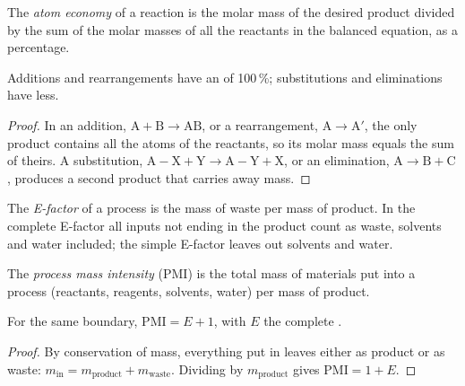 \begin{definition}\label{def:b3:green-industrial:atom-economy}
The \emph{atom economy} of a reaction is the molar mass of
the desired product divided by the sum of the molar masses of all the
reactants in the balanced equation, as a percentage.
\end{definition}

\begin{proposition}\label{prop:b3:green-industrial:ae-classes}
Additions and rearrangements have an  of 100\,\%; substitutions and
eliminations have less.
\end{proposition}

\begin{proof}
In an addition, $\mathrm{A} + \mathrm{B} \to \mathrm{AB}$, or a rearrangement, $\mathrm{A} \to \mathrm{A'}$, the only product contains all the
atoms of the reactants, so its molar mass equals the sum of theirs. A
substitution, $\mathrm{A{-}X} + \mathrm{Y} \to \mathrm{A{-}Y} + \mathrm{X}$, or an elimination, $\mathrm{A} \to \mathrm{B} + \mathrm{C}$, produces a
second product that carries away mass.
\end{proof}

\begin{definition}[E-factor]\label{def:b3:green-industrial:e-factor}
The \emph{E-factor} of a process is the mass of waste per mass of
product. In the complete E-factor all inputs not ending in the product count as
waste, solvents and water included; the simple E-factor leaves out solvents and
water.
\end{definition}

\begin{definition}\label{def:b3:green-industrial:pmi}
The \emph{process mass intensity} (PMI) is the
total mass of materials put into a process (reactants, reagents, solvents,
water) per mass of product.
\end{definition}

\begin{proposition}\label{prop:b3:green-industrial:pmi-e}
For the same boundary, $\mathrm{PMI} = E + 1$, with $E$ the complete .
\end{proposition}

\begin{proof}
By conservation of mass, everything put in leaves either as product or as waste:
$m_{\mathrm{in}} = m_{\mathrm{product}} + m_{\mathrm{waste}}$. Dividing by $m_{\mathrm{product}}$ gives $\mathrm{PMI} = 1 + E$.
\end{proof}


